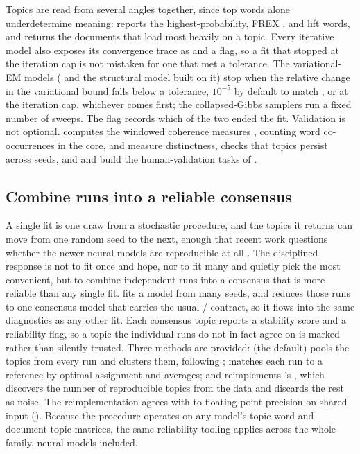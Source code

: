 \documentclass[article,nojss]{jss}
\begin{document}
Topics are read from several angles together, since top words alone underdetermine
meaning:  reports the highest-probability, FREX
\citep{bischof2012frex}, and lift words, and  returns the
documents that load most heavily on a topic. Every iterative model also exposes
its convergence trace as  and a  flag, so a fit
that stopped at the iteration cap is not mistaken for one that met a tolerance.
The variational-EM models ( and the structural model built on it) stop
when the relative change in the variational bound falls below a tolerance,
\(10^{-5}\) by default to match  , or at the iteration cap,
whichever comes first; the collapsed-Gibbs samplers run a fixed number of sweeps.
The  flag records which of the two ended the fit.
Validation is not optional.
 computes the windowed coherence measures
\citep{lau2014coherence}, counting word co-occurrences in the core,
 and
 measure distinctness, 
checks that topics persist across seeds, and  and
 build the human-validation tasks of
\citet{chang2009reading}.

\subsection{Combine runs into a reliable consensus}\label{sec:ensemble}

A single fit is one draw from a stochastic procedure, and the topics it returns
can move from one random seed to the next, enough that recent work questions
whether the newer neural models are reproducible at all \citep{hoyle2022broken}.
The disciplined response is not to fit once and hope, nor to fit many and quietly
pick the most convenient, but to combine independent runs into a consensus that is
more reliable than any single fit.  fits a model from
many seeds, and  reduces those runs to one consensus model
that carries the usual / contract, so it flows
into the same diagnostics as any other fit. Each consensus topic reports a
stability score and a reliability flag, so a topic the individual runs do not in
fact agree on is marked rather than silently trusted. Three methods are provided:
 (the default) pools the topics from every run and clusters them,
following \citet{hoyle2022broken};  matches each run to a reference by
optimal assignment and averages; and  reimplements 's
 \citep{rehurek2010gensim}, which discovers the number of
reproducible topics from the data and discards the rest as noise. The
reimplementation agrees with  to floating-point precision on shared
input (). Because the procedure
operates on any model's topic-word and document-topic matrices, the same
reliability tooling applies across the whole family, neural models included.
\end{document}
